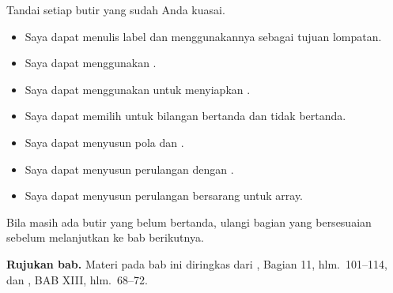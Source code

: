 \begin{checklistbox}
\vspace{1.1em}
Tandai setiap butir yang sudah Anda kuasai.

\begin{itemize}
    \item[\checkbox] Saya dapat menulis label dan menggunakannya
          sebagai tujuan lompatan.
    \item[\checkbox] Saya dapat menggunakan .
    \item[\checkbox] Saya dapat menggunakan  untuk
          menyiapkan .
    \item[\checkbox] Saya dapat memilih  untuk bilangan
          bertanda dan tidak bertanda.
    \item[\checkbox] Saya dapat menyusun pola  dan
          .
    \item[\checkbox] Saya dapat menyusun perulangan dengan
          .
    \item[\checkbox] Saya dapat menyusun perulangan bersarang untuk
          array.
\end{itemize}

\vspace{0.4em}
Bila masih ada butir yang belum bertanda, ulangi bagian yang
bersesuaian sebelum melanjutkan ke bab berikutnya.
\end{checklistbox}

\begin{infobox}
\vspace{1.1em}
\textbf{Rujukan bab.} Materi pada bab ini diringkas dari
\cite{gunawan2019}, Bagian 11, hlm.~101--114, dan
\cite{sto2001}, BAB XIII, hlm.~68--72.
\end{infobox}
